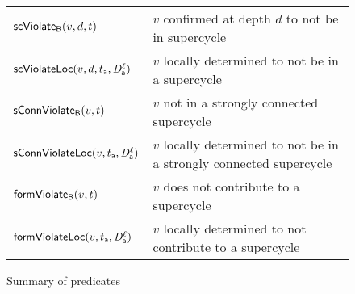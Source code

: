 \begin{figure}[ht]

\begin{tabular}{|l|l|}
\hline
$\mathsf{scViolate}_{\mathsf{B}}(v,d,t)$  & $v$ confirmed at depth $d$ to not be in supercycle\\ 
$\mathsf{scViolateLoc}(v,d,t_{\mathsf{a}},\mathit{D}_{\mathsf{a}}^{\ell})$ & $v$ locally determined to not be in a supercycle\\

$\mathsf{sConnViolate}_{\mathsf{B}}(v,t)$ & $v$ not in a strongly connected supercycle \\

$\mathsf{sConnViolateLoc}(v,t_{\mathsf{a}},\mathit{D}_{\mathsf{a}}^{\ell})$ & $v$ locally determined to not be in a strongly connected supercycle \\

$\mathsf{formViolate}_{\mathsf{B}}(v,t)$ & $v$ does not contribute to a supercycle\\

$\mathsf{formViolateLoc}(v,t_{\mathsf{a}},\mathit{D}_{\mathsf{a}}^{\ell})$ & $v$ locally determined to not contribute to a supercycle\\

\hline
\end{tabular}

\caption{Summary of predicates}
\label{fig:summaryPredicates}
\end{figure}


